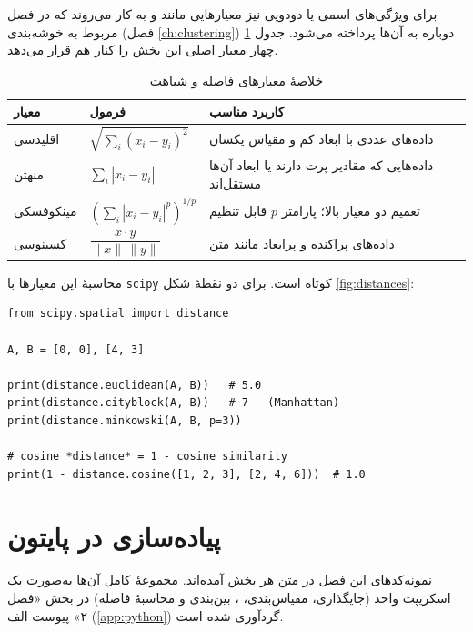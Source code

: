 برای ویژگی‌های اسمی یا دودویی نیز معیارهایی مانند
 و
 به کار می‌روند که در فصل
مربوط به خوشه‌بندی (فصل \ref{ch:clustering}) دوباره به آن‌ها پرداخته می‌شود.
جدول \ref{tab:distance-summary} چهار معیار اصلی این بخش را کنار هم قرار می‌دهد.

\begin{table}[htbp]
\centering
\caption{خلاصهٔ معیارهای فاصله و شباهت}
\label{tab:distance-summary}
\begin{tabular}{@{}p{2.6cm}p{3.9cm}p{5.6cm}@{}}
\toprule
\textbf{معیار} & \textbf{فرمول} & \textbf{کاربرد مناسب} \\
\midrule
اقلیدسی & $\sqrt{\sum_i (x_i-y_i)^2}$ & داده‌های عددی با ابعاد کم و مقیاس یکسان \\
\addlinespace
منهتن & $\sum_i |x_i-y_i|$ & داده‌هایی که مقادیر پرت دارند یا ابعاد آن‌ها مستقل‌اند \\
\addlinespace
مینکوفسکی & $\left(\sum_i |x_i-y_i|^p\right)^{1/p}$ & تعمیم دو معیار بالا؛ پارامتر $p$ قابل تنظیم \\
\addlinespace
کسینوسی & $\dfrac{x\cdot y}{\|x\|\,\|y\|}$ & داده‌های پراکنده و پرابعاد مانند متن \\
\bottomrule
\end{tabular}
\end{table}

محاسبهٔ این معیارها با \texttt{scipy} کوتاه است. برای دو نقطهٔ شکل
\ref{fig:distances}:

\begin{lstlisting}
from scipy.spatial import distance

A, B = [0, 0], [4, 3]

print(distance.euclidean(A, B))   # 5.0
print(distance.cityblock(A, B))   # 7   (Manhattan)
print(distance.minkowski(A, B, p=3))

# cosine *distance* = 1 - cosine similarity
print(1 - distance.cosine([1, 2, 3], [2, 4, 6]))  # 1.0
\end{lstlisting}

\section*{پیاده‌سازی در پایتون}

نمونه‌کدهای این فصل در متن هر بخش آمده‌اند. مجموعهٔ کامل آن‌ها به‌صورت یک
اسکریپت واحد (جایگذاری، مقیاس‌بندی، ، بین‌بندی و محاسبهٔ فاصله) در بخش
«فصل ۲» پیوست الف (\ref{app:python}) گردآوری شده است.

